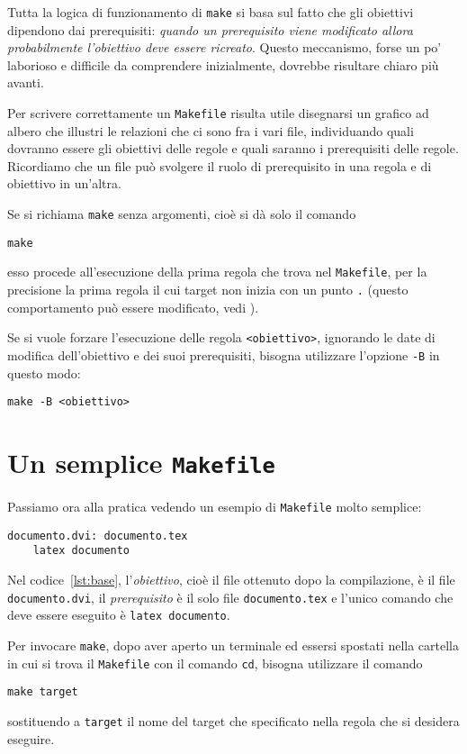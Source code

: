 Tutta la logica di funzionamento di \verb|make| si basa sul fatto che gli
obiettivi dipendono dai prerequisiti:
\emph{quando un prerequisito viene modificato allora probabilmente l'obiettivo
  deve essere ricreato}.
Questo meccanismo, forse un po' laborioso e difficile da comprendere
inizialmente, dovrebbe risultare chiaro più avanti.

Per scrivere correttamente un \verb|Makefile| risulta utile disegnarsi un
grafico ad albero che illustri le relazioni che ci sono fra i vari file,
individuando quali dovranno essere gli obiettivi delle regole e quali saranno i
prerequisiti delle regole.  Ricordiamo che un file può svolgere il ruolo di
prerequisito in una regola e di obiettivo in un'altra.

Se si richiama \verb|make| senza argomenti, cioè si dà solo il comando
\begin{verbatim}
make
\end{verbatim}
esso procede all'esecuzione della prima regola che trova nel \verb|Makefile|,
per la precisione la prima regola il cui target non inizia con un punto \verb|.|
(questo comportamento può essere modificato, vedi \textcite[5]{gnu:make}).

Se si vuole forzare l'esecuzione delle regola \verb|<obiettivo>|, ignorando le
date di modifica dell'obiettivo e dei suoi prerequisiti, bisogna utilizzare
l'opzione \texttt{-B} in questo modo:
\begin{verbatim}
make -B <obiettivo>
\end{verbatim}

\section{Un semplice \texttt{Makefile}}
\label{sec:makefile-semplice}

Passiamo ora alla pratica vedendo un esempio di \verb|Makefile| molto semplice:
\begin{lstlisting}[caption={Un semplice \texttt{Makefile}},label=lst:base,
showtabs=true,tab=\rightarrowfill]
documento.dvi: documento.tex
	latex documento
\end{lstlisting}
Nel codice~\ref{lst:base}, l'\emph{obiettivo}, cioè il file ottenuto dopo la
compilazione, è il file \verb|documento.dvi|, il \emph{prerequisito} è il solo
file \verb|documento.tex| e l'unico comando che deve essere eseguito è
\verb|latex documento|.

Per invocare \verb|make|, dopo aver aperto un terminale ed essersi spostati
nella cartella in cui si trova il \verb|Makefile| con il comando \verb|cd|,
bisogna utilizzare il comando
\begin{verbatim}
make target
\end{verbatim}
sostituendo a \verb|target| il nome del target che specificato nella regola che
si desidera eseguire.


